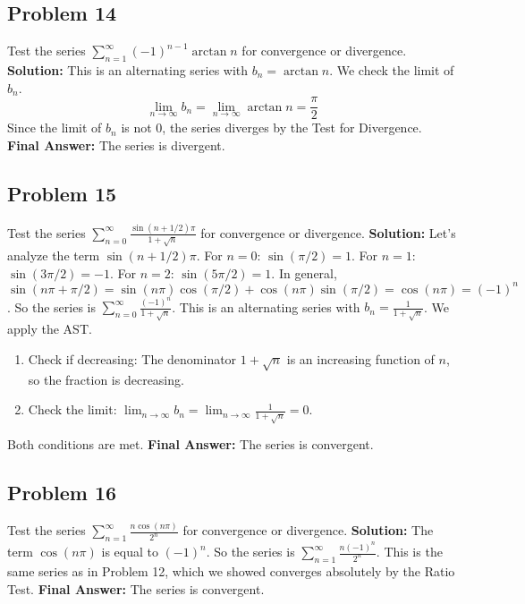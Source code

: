 \documentclass{article}
\begin{document}
\subsection*{Problem 14}
Test the series $\sum_{n=1}^{\infty} (-1)^{n-1} \arctan n$ for convergence or divergence.
\textbf{Solution:} This is an alternating series with $b_n = \arctan n$. We check the limit of $b_n$.
\[ \lim_{n \to \infty} b_n = \lim_{n \to \infty} \arctan n = \frac{\pi}{2} \]
Since the limit of $b_n$ is not 0, the series diverges by the Test for Divergence.
\textbf{Final Answer:} The series is divergent.

\subsection*{Problem 15}
Test the series $\sum_{n=0}^{\infty} \frac{\sin(n + 1/2)\pi}{1+\sqrt{n}}$ for convergence or divergence.
\textbf{Solution:} Let's analyze the term $\sin(n + 1/2)\pi$.
For $n=0$: $\sin(\pi/2)=1$. For $n=1$: $\sin(3\pi/2)=-1$. For $n=2$: $\sin(5\pi/2)=1$.
In general, $\sin(n\pi + \pi/2) = \sin(n\pi)\cos(\pi/2) + \cos(n\pi)\sin(\pi/2) = \cos(n\pi) = (-1)^n$.
So the series is $\sum_{n=0}^{\infty} \frac{(-1)^n}{1+\sqrt{n}}$. This is an alternating series with $b_n = \frac{1}{1+\sqrt{n}}$. We apply the AST.
\begin{enumerate}
    \item Check if decreasing: The denominator $1+\sqrt{n}$ is an increasing function of $n$, so the fraction is decreasing.
    \item Check the limit: $\lim_{n \to \infty} b_n = \lim_{n \to \infty} \frac{1}{1+\sqrt{n}} = 0$.
\end{enumerate}
Both conditions are met.
\textbf{Final Answer:} The series is convergent.

\subsection*{Problem 16}
Test the series $\sum_{n=1}^{\infty} \frac{n \cos(n\pi)}{2^n}$ for convergence or divergence.
\textbf{Solution:} The term $\cos(n\pi)$ is equal to $(-1)^n$. So the series is $\sum_{n=1}^{\infty} \frac{n (-1)^n}{2^n}$. This is the same series as in Problem 12, which we showed converges absolutely by the Ratio Test.
\textbf{Final Answer:} The series is convergent.
\end{document}
